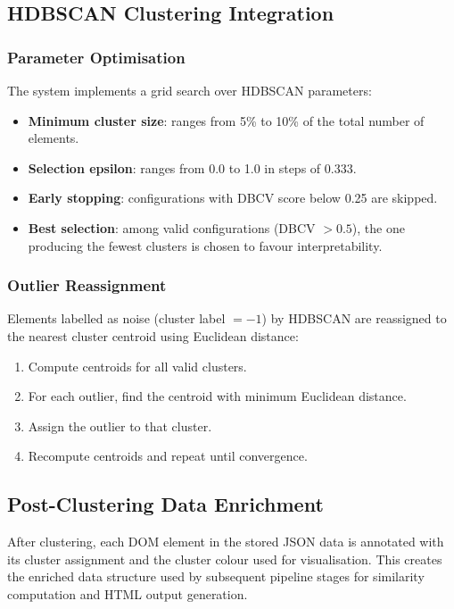 \subsection{HDBSCAN Clustering Integration}
\label{subsec:clustering-integration}

\subsubsection{Parameter Optimisation}
The system implements a grid search over HDBSCAN parameters:
\begin{itemize}
    \item \textbf{Minimum cluster size}: ranges from 5\% to 10\% of the total number of elements.
    \item \textbf{Selection epsilon}: ranges from 0.0 to 1.0 in steps of 0.333.
    \item \textbf{Early stopping}: configurations with DBCV score below 0.25 are skipped.
    \item \textbf{Best selection}: among valid configurations (DBCV $> 0.5$), the one producing the fewest clusters is chosen to favour interpretability.
\end{itemize}

\subsubsection{Outlier Reassignment}
Elements labelled as noise (cluster label $= -1$) by HDBSCAN are reassigned to the nearest cluster centroid using Euclidean distance:
\begin{enumerate}
    \item Compute centroids for all valid clusters.
    \item For each outlier, find the centroid with minimum Euclidean distance.
    \item Assign the outlier to that cluster.
    \item Recompute centroids and repeat until convergence.
\end{enumerate}

\subsection{Post-Clustering Data Enrichment}

After clustering, each DOM element in the stored JSON data is annotated with its cluster assignment and the cluster colour used for visualisation. This creates the enriched data structure used by subsequent pipeline stages for similarity computation and HTML output generation.

